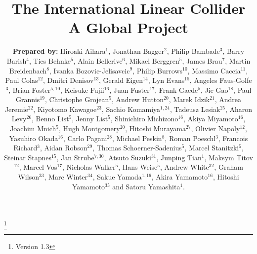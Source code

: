 \documentclass[%
 reprint,
nofootinbib,
 amsmath,amssymb,
 aps,
]{revtex4-1}
\begin{document}

\title{The International Linear Collider \\ A Global Project}%
\thanks{Version 1.3}%

\author{\textbf{Prepared by:}
Hiroaki Aihara$^1$, Jonathan Bagger$^2$, Philip Bambade$^3$, Barry Barish$^4$,  Ties Behnke$^5$, Alain Bellerive$^6$, Mikael Berggren$^5$, James Brau$^7$, Martin Breidenbach$^8$, 
Ivanka Bozovic-Jelisavcic$^9$,
Philip Burrows$^{10}$, Massimo Caccia$^{11}$, Paul Colas$^{12}$, Dmitri Denisov$^{13}$, Gerald Eigen$^{14}$, Lyn Evans$^{15}$, Angeles Faus-Golfe$^{3}$, Brian Foster$^{5,10}$, Keisuke Fujii$^{16}$, Juan Fuster$^{17}$, Frank Gaede$^{5}$, Jie Gao$^{18}$, Paul Grannis$^{19}$, Christophe Grojean$^{5}$, Andrew Hutton$^{20}$, Marek Idzik$^{21}$, Andrea Jeremie$^{22}$, Kiyotomo Kawagoe$^{23}$, Sachio Komamiya$^{1,24}$, Tadeusz Lesiak$^{25}$, Aharon Levy$^{26}$, Benno List$^{5}$, Jenny List$^{5}$, Shinichiro Michizono$^{16}$, Akiya Miyamoto$^{16}$, Joachim Mnich$^{5}$, Hugh Montgomery$^{20}$, Hitoshi Murayama$^{27}$, Olivier Napoly$^{12}$, Yasuhiro Okada$^{16}$, Carlo Pagani$^{28}$, Michael Peskin$^{8}$, Roman Poeschl$^{3}$, Francois Richard$^{3}$, Aidan Robson$^{29}$, Thomas Schoerner-Sadenius$^{5}$, Marcel Stanitzki$^5$, Steinar Stapnes$^{15}$, Jan Strube$^{7,30}$, Atsuto Suzuki$^{31}$, Junping Tian$^{1}$, Maksym Titov$^{12}$, Marcel Vos$^{17}$, Nicholas Walker$^{5}$, Hans Weise$^{5}$, Andrew White$^{32}$, Graham Wilson$^{33}$, Marc Winter$^{34}$, Sakue Yamada$^{1,16}$, Akira Yamamoto$^{16}$, Hitoshi Yamamoto$^{35}$ and Satoru Yamashita$^{1}$. }
\end{document}
